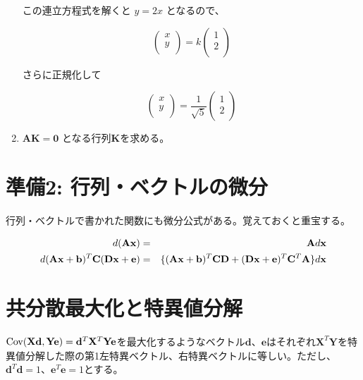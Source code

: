 \begin{enumerate}
この連立方程式を解くと \(y = 2x\) となるので、

\[
\left(
\begin{array}{c}
x \\
y \\
\end{array}
\right)
= k
\left(
\begin{array}{r}
1 \\
2 \\
\end{array}
\right)
\]

さらに正規化して

\[
\left(
\begin{array}{c}
x \\
y \\
\end{array}
\right)
= \frac{1}{\sqrt{5}}
\left(
\begin{array}{r}
1 \\
2 \\
\end{array}
\right)
\]

\item \({\mathbf A}{\mathbf K} = {\mathbf 0}\) となる行列\({\mathbf K}\)を求める。




\end{enumerate}



\section{準備2: 行列・ベクトルの微分}
行列・ベクトルで書かれた関数にも微分公式がある。覚えておくと重宝する。

\begin{eqnarray*}
d ({\bf Ax}) & = & {\mathbf A}d{\mathbf x}\\
d ({\bf Ax + b})^T {\mathbf C} ({\bf Dx + e}) & = & \{({\bf Ax + b})^T {\bf CD} +({\bf Dx + e})^T{\mathbf C}^T{\mathbf A}\}d{\mathbf x}\\
\end{eqnarray*}

\section{共分散最大化と特異値分解}
\({\rm Cov}( {\mathbf X}{\mathbf d},{\mathbf Y}{\mathbf e}) = {\mathbf d}^T{\mathbf X}^T{\mathbf Y}{\mathbf e}\)を最大化するようなベクトル\({\mathbf d}\)、\({\mathbf e}\)はそれぞれ\({\mathbf X}^T{\mathbf Y}\)を特異値分解した際の第1左特異ベクトル、右特異ベクトルに等しい。ただし、\({\mathbf d}^T{\mathbf d}=1\)、\({\mathbf e}^T{\mathbf e}=1\)とする。


